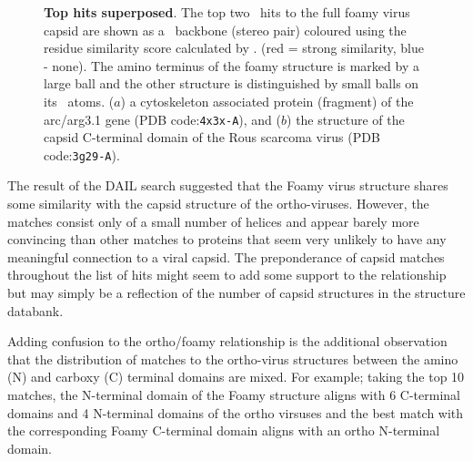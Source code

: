 \begin{figure}
\centering
{}
\begin{footnotesize}
\caption{
\label{Fig:top2}
{\bf Top hits superposed}.
The top two \DALI\ hits to the full foamy virus capsid are shown as a \CA\ backbone (stereo pair) coloured using
the residue similarity score calculated by \SAP. (red = strong similarity, blue - none).
The amino terminus of the foamy structure is marked by a large ball and the other structure is distinguished
by small balls on its \CA\ atoms.
($a$) a cytoskeleton associated protein (fragment) of the arc/arg3.1 gene (PDB code:{\tt 4x3x-A}),
and 
($b$) the structure of the capsid C-terminal domain of the Rous scarcoma virus (PDB code:{\tt 3g29-A}). 
}
\end{footnotesize}
\end{figure}

The result of the DAIL search suggested that the Foamy virus structure shares some similarity with the
capsid structure of the ortho-viruses.  However, the matches consist only of a small number of
helices and appear barely more convincing than other matches to proteins that seem very unlikely
to have any meaningful connection to a viral capsid.   The preponderance of capsid matches
throughout the list of hits might seem to add some support to the relationship but may simply be 
a reflection of the number of capsid structures in the structure databank.

Adding confusion to the ortho/foamy relationship is the additional observation that 
the distribution of matches to the ortho-virus structures between the amino (N) and carboxy
(C) terminal domains are mixed.   For example; taking the top 10 matches, the N-terminal domain of the Foamy
structure aligns with 6 C-terminal domains and 4 N-terminal domains of the ortho virsuses
and the best match with the corresponding Foamy C-terminal domain aligns with an ortho N-terminal domain.

